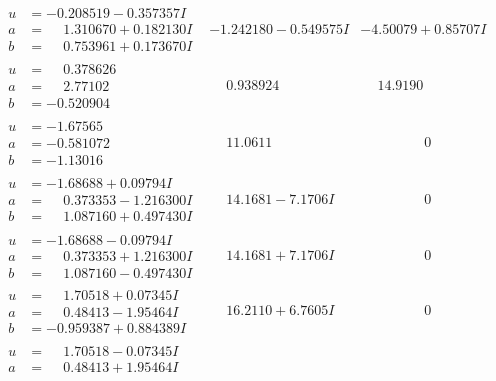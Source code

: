 \documentclass[1p]{elsarticle_modified}
\theoremstyle{definition}
\begin{document}
$$\begin{array}{c|c|c}
\begin{aligned}
u &= -0.208519 - 0.357357 I \\
a &= \phantom{-}1.310670 + 0.182130 I \\
b &= \phantom{-}0.753961 + 0.173670 I\end{aligned}
 & -1.242180 - 0.549575 I & -4.50079 + 0.85707 I \\ \hline\begin{aligned}
u &= \phantom{-}0.378626\phantom{ +0.000000I} \\
a &= \phantom{-}2.77102\phantom{ +0.000000I} \\
b &= -0.520904\phantom{ +0.000000I}\end{aligned}
 & \phantom{-}0.938924\phantom{ +0.000000I} & \phantom{-}14.9190\phantom{ +0.000000I} \\ \hline\begin{aligned}
u &= -1.67565\phantom{ +0.000000I} \\
a &= -0.581072\phantom{ +0.000000I} \\
b &= -1.13016\phantom{ +0.000000I}\end{aligned}
 & \phantom{-}11.0611\phantom{ +0.000000I} & \phantom{-0.000000 } 0 \\ \hline\begin{aligned}
u &= -1.68688 + 0.09794 I \\
a &= \phantom{-}0.373353 - 1.216300 I \\
b &= \phantom{-}1.087160 + 0.497430 I\end{aligned}
 & \phantom{-}14.1681 - 7.1706 I & \phantom{-0.000000 } 0 \\ \hline\begin{aligned}
u &= -1.68688 - 0.09794 I \\
a &= \phantom{-}0.373353 + 1.216300 I \\
b &= \phantom{-}1.087160 - 0.497430 I\end{aligned}
 & \phantom{-}14.1681 + 7.1706 I & \phantom{-0.000000 } 0 \\ \hline\begin{aligned}
u &= \phantom{-}1.70518 + 0.07345 I \\
a &= \phantom{-}0.48413 - 1.95464 I \\
b &= -0.959387 + 0.884389 I\end{aligned}
 & \phantom{-}16.2110 + 6.7605 I & \phantom{-0.000000 } 0 \\ \hline\begin{aligned}
u &= \phantom{-}1.70518 - 0.07345 I \\
a &= \phantom{-}0.48413 + 1.95464 I \\

\end{aligned}
\end{array}$$
\end{document}
